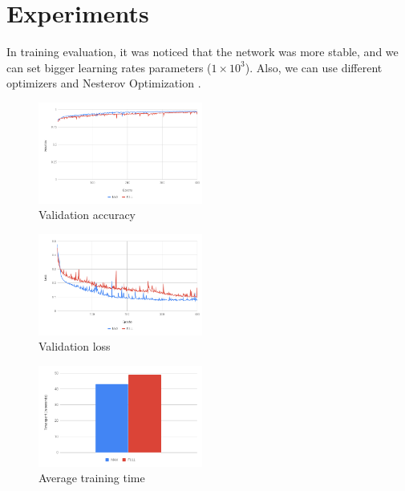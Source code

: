\section{Experiments}
\label{sec:experiments}

In training evaluation, it was noticed that the network was more stable, and we can set bigger learning rates parameters ($1 \times 10^3$). Also, we can use different optimizers and Nesterov Optimization \cite{Nesterov:1983wy}.

\begin{figure}
  \centering
  \includegraphics[width=0.48\textwidth]{figures/val_acc.png}
  \caption{Validation accuracy}
  \label{fig:val_accuracy}
\end{figure}

\begin{figure}
  \centering
  \includegraphics[width=0.48\textwidth]{figures/val_loss.png}
  \caption{Validation loss}
  \label{fig:val_loss}
\end{figure}

\begin{figure}
  \centering
  \includegraphics[width=0.48\textwidth]{figures/train_time.png}
  \caption{Average training time}
  \label{fig:train_time}
\end{figure}

